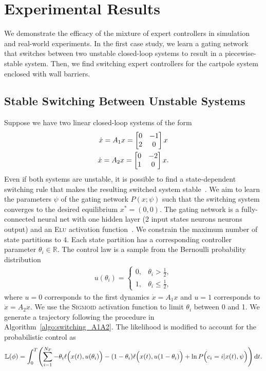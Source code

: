 \section{Experimental Results}
\label{sec:moe_results}
We demonstrate the efficacy of the mixture of expert controllers in simulation
and real-world experiments.
%
In the first case study, we learn a gating network that switches between two
unstable closed-loop systems to result in a piecewise-stable system.
%
Then, we find switching expert controllers for the cartpole system enclosed with
wall barriers.
%

\subsection{Stable Switching Between Unstable Systems}

Suppose we have two linear closed-loop systems of the form 
\begin{equation}
    \begin{gathered}
        \dot{x} = A_1x = \begin{bmatrix}0 & -1 \\ 2 & 0\end{bmatrix}x \\
        \dot{x} = A_2x = \begin{bmatrix}0 & -2 \\ 1 & 0\end{bmatrix}x.
    \end{gathered}
    \label{eq:unstable_closedloop}
\end{equation}
%
Even if both systems are unstable, it is possible to find a state-dependent
switching rule that makes the resulting switched system
stable~\cite{liberzon2003switching}. 
%
We aim to learn the parameters $\psi$ of the gating network $P(x;
\psi)$ such that the switching system converges to the desired equilibrium $x^*
= (0, 0)$.
%
The gating network is a fully-connected neural net with one hidden layer (2 input states 
 neurons  neurons  output) and an \textsc{Elu} activation
function~\cite{clevert2015fast}.
%
We constrain the maximum number of state partitions to $4$.
%
Each state partition has a corresponding controller parameter $\theta_i \in
\mathbb{R}$. 
%
The control law is a sample from the Bernoulli probability distribution
\begin{align}
    u(\theta_i) = \begin{cases}
       0, & \theta_i > \frac{1}{2}, \\
       1, & \theta_i \leq \frac{1}{2},
    \end{cases}
\end{align}
\noindent where $u = 0$ corresponds to the first dynamics $\dot{x} = A_1
x$ and $u=1$ corresponds to $\dot{x} = A_2x$.
%
We use the \textsc{Sigmoid} activation function to limit $\theta_i$ between 0
and 1.
%
We generate a trajectory following the procedure in
Algorithm~\eqref{algo:switching_A1A2}.
%
The likelihood is modified to account for the probabilistic control as
\begin{align*}
    \mathbb{L}(\phi) = \int_{0}^{T} \Biggl( \sum_{i=1}^{N_F} - \theta_i \ell \Bigl(x(t), u(\theta_i) \Bigr) - (1- \theta_i)\ell \Bigl(x(t), u(1-\theta_i) \Bigr) +
    \ln  P\Bigl(c_i = i | x(t), \psi \Bigr)  \Biggr) \operatorname{d}\! t.
\end{align*}

